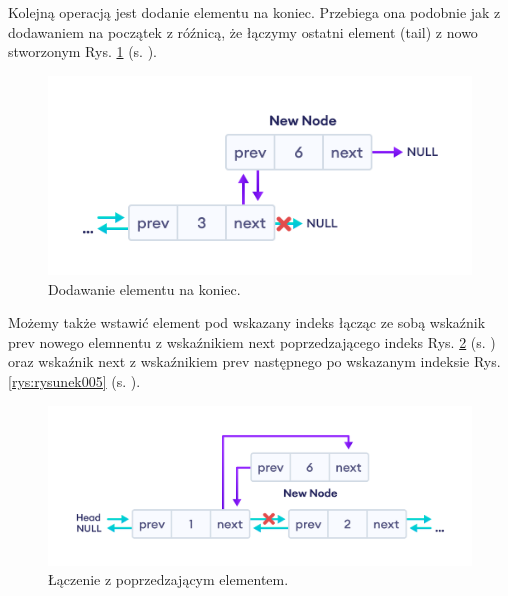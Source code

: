 \newpage

\hspace{0.60cm}Kolejną operacją jest dodanie elementu na koniec. Przebiega ona podobnie jak z dodawaniem na początek z róźnicą, że łączymy ostatni element (tail) z nowo stworzonym Rys. \ref{rys:rysunek003} (s. \pageref{rys:rysunek003}).

\begin{figure}[!htb]
	\begin{center}
		\includegraphics[scale=0.7]{Dokumentacja/rys/dodaj_na_koniec.png}
		\caption{Dodawanie elementu na koniec.}
		\label{rys:rysunek003}
	\end{center}
\end{figure}


\hspace{0.60cm}Możemy także wstawić element pod wskazany indeks łącząc ze sobą wskaźnik prev nowego elemnentu z wskaźnikiem next poprzedzającego indeks Rys. \ref{rys:rysunek004} (s. \pageref{rys:rysunek004}) oraz wskaźnik next z wskaźnikiem prev następnego po wskazanym indeksie Rys. \ref{rys:rysunek005} (s. \pageref{rys:rysunek005}).

\begin{figure}[!htb]
	\begin{center}
		\includegraphics[scale=0.7]{Dokumentacja/rys/dodaj_indeks1.png}
		\caption{Łączenie z poprzedzającym elementem.}
		\label{rys:rysunek004}
	\end{center}
\end{figure}

